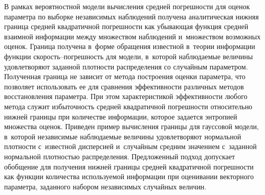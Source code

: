 \begin{multicols}{2}
В рамках вероятностной модели вы\-чис\-ле\-ния\linebreak
 сред\-ней по\-греш\-ности для оценок па\-ра\-мет\-ра по 
выборке независимых наблюдений получена аналитическая ниж\-няя граница сред\-ней 
квад\-ра\-тич\-ной по\-греш\-ности как убы\-ва\-ющая функция средней \mbox{взаимной} информации между 
множеством наблюдений и~множеством возможных оценок. Граница получена в~форме 
обращения известной в~тео\-рии информации функции ско\-рость--по\-греш\-ность для модели, 
в~которой наблюдаемые величины удовле\-тво\-ря\-ют заданной плот\-ности распределения со 
случайным па\-ра\-мет\-ром. Полученная граница не зависит от метода по\-стро\-ения оценки 
па\-ра\-мет\-ра, что поз\-во\-ля\-ет использовать ее для сравнения эф\-фек\-тив\-ности различных методов 
восстановления па\-ра\-мет\-ра. При этом характеристикой эф\-фек\-тив\-ности любого метода служит 
из\-бы\-точ\-ность сред\-ней квад\-ра\-тич\-ной по\-греш\-ности относительно ниж\-ней границы при 
количестве информации, которое задается энт\-ро\-пи\-ей множества оценок. Приведен пример 
вычисления границы для гауссовой модели, в~которой независимые наблюдаемые величины 
удовле\-тво\-ря\-ют нормальной плот\-ности с~известной дис\-пер\-си\-ей и~случайным средним значением 
с~заданной нормальной плот\-ностью распределения. Предложенный подход допускает 
обобщение для получения ниж\-ней границы средней квад\-ра\-тич\-ной по\-греш\-ности как функции 
количества ис\-поль\-зу\-емой информации при оценивании векторного па\-ра\-мет\-ра, заданного 
набором независимых случайных величин.


\end{multicols}
